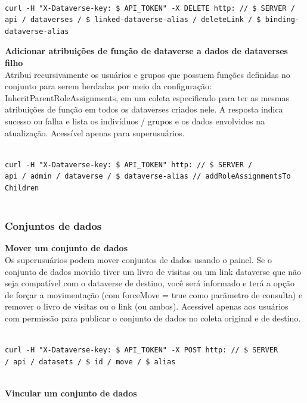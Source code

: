 \documentclass[12pt,hidelinks]{article}
\begin{document}
\begin{verbatim}

curl -H "X-Dataverse-key: $ API_TOKEN" -X DELETE http: // $ SERVER / 
api / dataverses / $ linked-dataverse-alias / deleteLink / $ binding-
dataverse-alias

\end{verbatim}
 
\textbf{Adicionar atribuições de função de dataverse a dados de dataverses filho}\\

Atribui recursivamente os usuários e grupos que possuem funções definidas no conjunto para serem herdadas por meio da configuração: InheritParentRoleAssignments, em um coleta especificado para ter as mesmas atribuições de função em todos os dataverses criados nele. A resposta indica sucesso ou falha e lista os indivíduos / grupos e os dados envolvidos na atualização. Acessível apenas para superusuários.

\begin{verbatim}

curl -H "X-Dataverse-key: $ API_TOKEN" http: // $ SERVER / 
api / admin / dataverse / $ dataverse-alias // addRoleAssignmentsTo
Children
 
 \end{verbatim}
 
\subsubsection{Conjuntos de dados}

\qquad\textbf{Mover um conjunto de dados}\\

Os superusuários podem mover conjuntos de dados usando o painel. Se o conjunto de dados movido tiver um livro de visitas ou um link dataverse que não seja compatível com o dataverse de destino, você será informado e terá a opção de forçar a movimentação (com forceMove = true como parâmetro de consulta) e remover o livro de visitas ou o link (ou ambos). Acessível apenas aos usuários com permissão para publicar o conjunto de dados no coleta original e de destino.

\begin{verbatim}

curl -H "X-Dataverse-key: $ API_TOKEN" -X POST http: // $ SERVER 
/ api / datasets / $ id / move / $ alias
 
\end{verbatim}

\textbf{Vincular um conjunto de dados}\\
\end{document}
